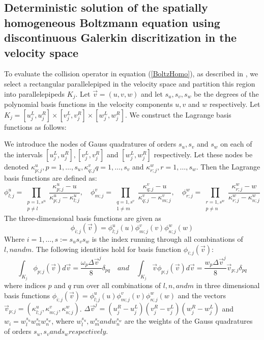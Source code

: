 \documentclass{article}
\begin{document}
\subsection{Deterministic solution of the spatially homogeneous Boltzmann equation using discontinuous Galerkin discritization in the velocity space} \label{DGSol}
To evaluate the collision operator in equation (\ref{BoltzHomo}), as described in \cite{Alekseenko2}, we select a rectangular parallelepiped in the velocity space  and partition this region into parallelepipeds $K_j$. Let $\vec{v} = (u,v,w)$ and let $s_u, s_v, s_w$ be the degrees of the polynomial basis functions in the velocity components $u, v$ and $w$ respectively. Let $K_j = [u^L_j, u^R_j]\times[v^L_j,v^R_j]\times[w^L_j,w^R_j]$. We construct the Lagrange basis functions as follows:

We introduce the nodes of Gauss quadratures of orders $s_u, s_v$ and $s_w$ on each of the intervals $[u^L_j,u^R_j], [v^L_j,v^R_j]$ and $[w^L_j, w^R_j]$ respectively. Let these nodes be denoted $\kappa^u_{p;j}, p=1,\dots,s_u, \kappa^v_{q;j} q=1,\dots,s_v$ and $\kappa^w_{r;j}, r=1,\dots,s_w$. Then the Lagrange basis functions are defined as:
\begin{equation*}
\phi^u_{l;j} = \prod_{\substack{p=1,s^u \\ p \neq l}}\frac{\kappa^u_{p;j} - u}{\kappa^u_{p;j} - \kappa^u_{l;j}}, \quad \phi^v_{m;j} = \prod_{\substack{q=1,s^v \\ 1 \neq m}}\frac{\kappa^v_{q;j} - u}{\kappa^v_{q;j} - \kappa^v_{m;j}}, \quad \phi^w_{r;j} = \prod_{\substack{r=1,s^w \\ p \neq n}}\frac{\kappa^w_{r;j} - w}{\kappa^w_{r;j} - \kappa^w_{n;j}}
\end{equation*}
The three-dimensional basis functions are given as
\begin{equation}
	\phi_{i;j}(\vec{v})= \phi^u_{l;j}(u)\phi^v_{m;j}(v)\phi^w_{n;j}(w)
\end{equation} 
Where $i = 1,\dots,s:=s_us_vs_w$ is the index running through all combinations of $l, n and m$.
The following identities hold for basis function $\phi_{i;j}(\vec{v})$:
\begin{equation}
\int_{K_j}\phi_{p;j}(\vec{v})d\vec{v}= \frac{\omega_p\Delta\vec{v}^j}{8}\delta_{pq} \quad and\quad \int_{K_j}\vec{v}\phi_{p;j}(\vec{v})d\vec{v}= \frac{w_p\Delta\vec{v}^j}{8}\vec{v}_{p;j}\delta_{pq}
\end{equation}
where indices $p$ and $q$ run over all combinations of $l, n, and m$ in three dimensional basis functions $\phi_{i;j}(\vec{v})= \phi^u_{l;j}(u)\phi^v_{m;j}(v)\phi^w_{n;j}(w)$ and the vectors $\vec{v}_{p;j}=(\kappa^u_{l;j},\kappa^v_{m;j},\kappa^w_{n;j})$. $\Delta\vec{v}^j=(u^R_j - u^L_j)(v^R_j - v^L_j)(w^R_j - w^L_j)$ and $w_i = w^{s_u}_lw^{s_v}_mw^{s_w}_n$, where $w^{s_u}_l, w^{s_v}_m and w^{s_w}_n$ are the weights of the Gauss quadratures of orders $s_u, s_v and s_w respectively.$
\end{document}
